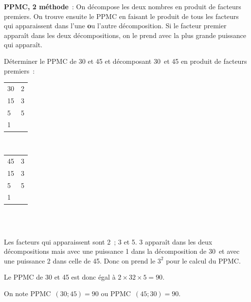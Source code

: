  \newpage
 
 
 \vspace{2em}

 
\begin{methode*1}

\textcolor{H1}{\textbf{PPMC, 2 méthode}} : On décompose les deux nombres en produit de facteurs premiers. On trouve ensuite le PPMC en faisant le produit de tous les facteurs qui apparaissent dans l'une {\textbf ou} l'autre décomposition. Si le facteur premier apparaît dans les deux décompositions, on le prend avec la plus grande puissance qui apparaît.

\begin{exemple*1}
Déterminer le PPMC de 30 et 45 et décomposant 30 et 45 en produit de facteurs premiers : \\[1em]
\begin{minipage}[t]{0.36\textwidth}
 \begin{tabularx}{0.4\textwidth}{X|X}
 30 & 2 \\ 
 15 & 3 \\
 5 & 5 \\
 1 & \\ 
 \end{tabularx} \\[1em]
\end{minipage} \hfill%
\begin{minipage}[t]{0.56\textwidth}
 \begin{tabularx}{0.3\textwidth}{X|X}
 45 & 3 \\ 
 15 & 3 \\
 5 & 5 \\
 1 & \\ 
 \end{tabularx} \\[1em]
 \end{minipage} \\
Les facteurs qui apparaissent sont 2 ; 3 et 5. 3 apparaît dans les deux décompositions mais avec une puissance 1 dans la décomposition de 30 et avec une puissance 2 dans celle de 45. Donc on prend le $3^2$ pour le calcul du PPMC.

Le PPMC de 30 et 45 est donc égal à $2 \times 32 \times 5 = 90$.

On note PPMC $(30 ; 45) = 90$ ou PPMC $(45 ; 30) = 90$. \\[-2em]
 \end{exemple*1}
 
\vspace{2em}


\end{methode*1}
